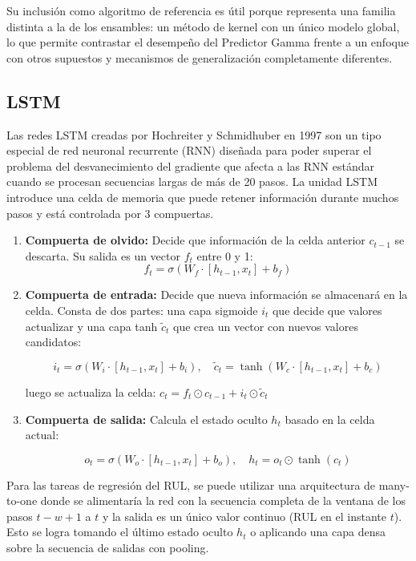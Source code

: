 Su inclusión como algoritmo de referencia es útil porque representa una familia distinta a la de los ensambles: un método de kernel con un único modelo global, lo que permite contrastar el desempeño del Predictor Gamma frente a un enfoque con otros supuestos y mecanismos de generalización completamente diferentes.

\subsection{LSTM}

Las redes LSTM creadas por Hochreiter y Schmidhuber en 1997 \cite{hochreiter1997} son un tipo especial de red neuronal recurrente (RNN) diseñada para poder superar el problema del desvanecimiento del gradiente que afecta a las RNN estándar cuando se procesan secuencias largas de más de 20 pasos. La unidad LSTM introduce una celda de memoria que puede retener información durante muchos pasos y está controlada por 3 compuertas.

\begin{enumerate}
    \item \textbf{Compuerta de olvido:} Decide que información de la celda anterior $c_{t-1}$ se descarta. Su salida es un vector $f_{t}$ entre 0 y 1:
    \[
    f_t = \sigma\left(W_f \cdot [h_{t-1}, x_t] + b_f\right)
    \]
    \item \textbf{Compuerta de entrada:} Decide que nueva información se almacenará en la celda. Consta de dos partes: una capa sigmoide $i_{t}$ que decide que valores actualizar y una capa tanh $\tilde{c}_t $ que crea un vector con nuevos valores candidatos:

    \[
    i_t = \sigma\left(W_i \cdot [h_{t-1}, x_t] + b_i\right), \quad
    \tilde{c}_t = \tanh\left(W_c \cdot [h_{t-1}, x_t] + b_c\right)
    \]

    luego se actualiza la celda: $c_t = f_t \odot c_{t-1} + i_t \odot \tilde{c}_t$
    \item \textbf{Compuerta de salida:} Calcula el estado oculto $h_{t}$ basado en la celda actual:

    \[
    o_t = \sigma\left(W_o \cdot [h_{t-1}, x_t] + b_o\right), \quad
    h_t = o_t \odot \tanh(c_t)
    \]
\end{enumerate}

Para las tareas de regresión del RUL, se puede utilizar una arquitectura de many-to-one donde se alimentaría la red con la secuencia completa de la ventana de los pasos $t-w + 1$ a $t$ y la salida es un único valor continuo (RUL en el instante $t$). Esto se logra tomando el último estado oculto $h_{t}$ o aplicando una capa densa sobre la secuencia de salidas con pooling.\\[.15cm]

